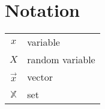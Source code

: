 \chapter*{Notation}

\begin{tabular}{cp{}}
    $x$ & variable \\
    $X$ & random variable \\
    $\vec{x}$ & vector \\ 
    $\mathbb{X}$ & set
\end{tabular}\\